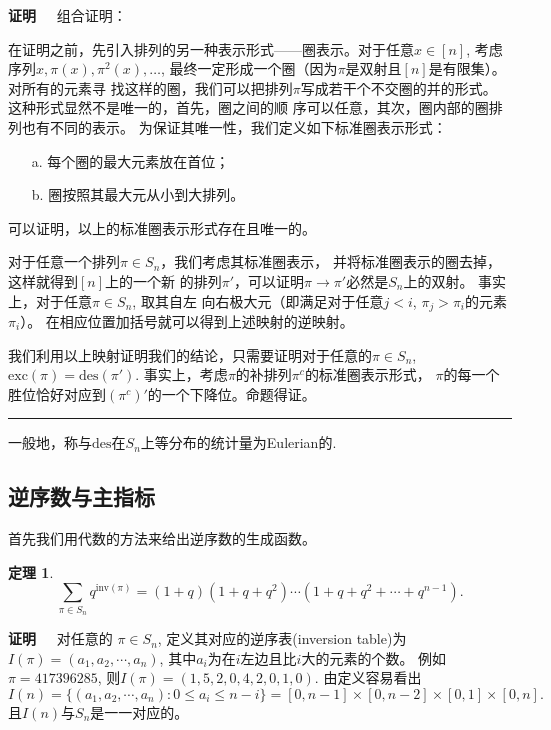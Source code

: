 \documentclass[a4paper,11pt]{article}
\newtheorem{thm}{定理}[section]
\def\qed{\nopagebreak\hfill{\rule{4pt}{7pt}}\medbreak}
\def\pf{{\bf 证明~~ }}
\def \des{\mathrm{des}}
\def \exc{\mathrm{exc}}
\def \inv{\mathrm{inv}}
\begin{document}
\pf 组合证明：

在证明之前，先引入排列的另一种表示形式——圈表示。对于任意$x\in
[n]$, 考虑 序列$x,\pi(x),\pi^2(x),\ldots$,
最终一定形成一个圈（因为$\pi$是双射且$[n]$是有限集）。对所有的元素寻
找这样的圈，我们可以把排列$\pi$写成若干个不交圈的并的形式。
这种形式显然不是唯一的，首先，圈之间的顺
序可以任意，其次，圈内部的圈排列也有不同的表示。
为保证其唯一性，我们定义如下标准圈表示形式：

\begin{itemize}
	\item [a.]每个圈的最大元素放在首位；
	\item [b.]圈按照其最大元从小到大排列。
\end{itemize}


可以证明，以上的标准圈表示形式存在且唯一的。

对于任意一个排列$\pi\in S_n$，我们考虑其标准圈表示，
并将标准圈表示的圈去掉，这样就得到$[n]$上的一个新
的排列$\pi'$，可以证明$\pi\rightarrow \pi'$必然是$S_n$上的双射。
事实上，对于任意$\pi\in S_n$, 取其自左
向右极大元（即满足对于任意$j<i$, $\pi_j>\pi_i$的元素$\pi_i$）。
在相应位置加括号就可以得到上述映射的逆映射。

我们利用以上映射证明我们的结论，只需要证明对于任意的$\pi\in S_n$,
$\exc(\pi)=\des(\pi')$.
事实上，考虑$\pi$的补排列$\pi^c$的标准圈表示形式，
$\pi$的每一个胜位恰好对应到$(\pi^c)'$的一个下降位。命题得证。\qed

一般地，称与$\des$在$S_n$上等分布的统计量为Eulerian的.


\subsection{逆序数与主指标}

首先我们用代数的方法来给出逆序数的生成函数。

\begin{thm}
	\begin{equation}
	\sum_{\pi\in
		S_n}q^{\inv(\pi)}=(1+q)(1+q+q^2)\cdots(1+q+q^2+\cdots+q^{n-1}).
	\end{equation}
\end{thm}

\pf 对任意的 $\pi \in S_n$, 定义其对应的逆序表(inversion table)为
$I(\pi)=(a_1,a_2,\cdots,a_n)$,
其中$a_i$为在$i$左边且比$i$大的元素的个数。
例如 $\pi=417396285$, 则$I(\pi)=(1,5,2,0,4,2,0,1,0)$.
由定义容易看出
\[I(n)=\{(a_1,a_2,\cdots,a_n): 0\leq a_i \leq n-i\}=
[0,n-1]\times [0,n-2] \times [0,1]\times [0,n].\]
且$I(n)$与$S_n$是一一对应的。
\end{document}
